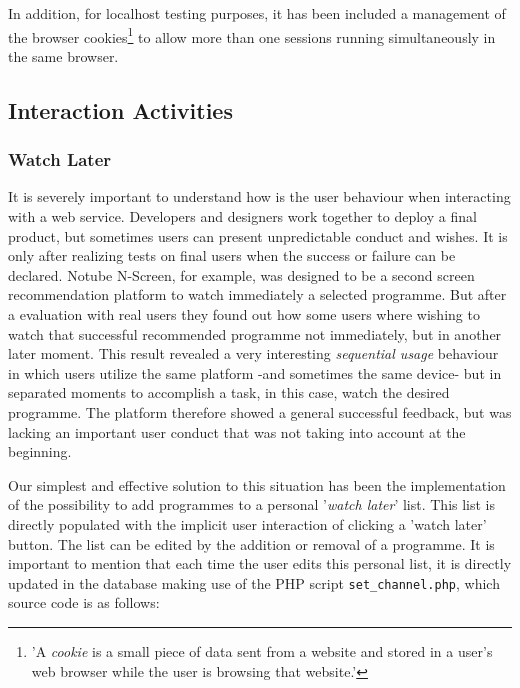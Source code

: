 \documentclass{acm_proc_article-sp}
\begin{document}
In addition, for localhost testing purposes, it has been included a management of the browser cookies\cite{wiki:cookie}\footnote{'A \textit{cookie} is a small piece of data sent from a website and stored in a user's web browser while the user is browsing that website.'} to allow more than one sessions running simultaneously in the same browser.

\subsection{Interaction Activities}
\subsubsection{Watch Later} \label{watchlater}
It is severely important to understand how is the user behaviour when interacting with a web service. Developers and designers work together to deploy a final product, but sometimes users can present unpredictable conduct and wishes\cite{norman2002design}. It is only after realizing tests on final users when the success or failure can be declared. Notube N-Screen, for example, was designed to be a second screen recommendation platform to watch immediately a selected programme. But after a evaluation with real users they found out how some users where wishing to watch that successful recommended programme not immediately, but in another later moment. This result revealed a very interesting \textit{sequential usage} behaviour in which users utilize the same platform -and sometimes the same device- but in separated moments to accomplish a task, in this case, watch the desired programme. The platform therefore showed a general successful feedback, but was lacking an important user conduct that was not taking into account at the beginning. 

Our simplest and effective solution to this situation\cite{krug2014don} has been the implementation of the possibility to add programmes to a personal '\textit{watch later}' list. This list is directly populated with the implicit user interaction of clicking a 'watch later' button. The list can be edited by the addition or removal of a programme. It is important to mention that each time the user edits this personal list, it is directly updated in the database making use of the PHP script \texttt{set\_channel.php}, which source code is as follows:
\end{document}
